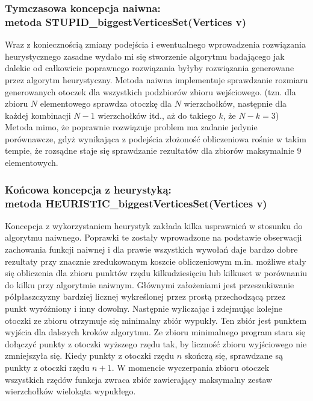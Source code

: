 \documentclass[11pt,a4paper]{article}
\begin{document}
\subsubsection{Tymczasowa koncepcja naiwna: \\ metoda STUPID\_biggestVerticesSet(Vertices v)}
Wraz z koniecznością zmiany podejścia i ewentualnego wprowadzenia rozwiązania heurystycznego zasadne wydało mi się stworzenie algorytmu badającego jak dalekie od całkowicie poprawnego rozwiązania byłyby rozwiązania generowane przez algorytm heurystyczny. Metoda naiwna implementuje sprawdzanie rozmiaru generowanych otoczek dla wszystkich podzbiorów zbioru wejściowego. (tzn. dla zbioru $N$ elementowego sprawdza otoczkę dla $N$ wierzchołków, następnie dla każdej kombinacji $N-1$ wierzchołków itd., aż do takiego $k$, że $N-k=3$) Metoda mimo, że poprawnie rozwiązuje problem ma zadanie jedynie porównawcze, gdyż wynikająca z podejścia złożoność obliczeniowa rośnie w takim tempie, że rozsądne staje się sprawdzanie rezultatów dla zbiorów maksymalnie 9 elementowych.

\subsubsection{Końcowa koncepcja z heurystyką: \\ metoda HEURISTIC\_biggestVerticesSet(Vertices v)}
Koncepcja z wykorzystaniem heurystyk zakłada kilka usprawnień w stosunku do algorytmu naiwnego. Poprawki te zostały wprowadzone na podstawie obserwacji zachowania funkcji naiwnej i dla prawie wszystkich wywołań daje bardzo dobre rezultaty przy znacznie zredukowanym koszcie obliczeniowym m.in. możliwe stały się obliczenia dla zbioru punktów rzędu kilkudziesięciu lub kilkuset w porównaniu do kilku przy algorytmie naiwnym. Głównymi założeniami jest przeszukiwanie półpłaszczyzny bardziej licznej wykreślonej przez prostą przechodzącą przez punkt wyróżniony i inny dowolny. Następnie wyliczając i zdejmując kolejne otoczki ze zbioru otrzymuje się minimalny zbiór wypukły. Ten zbiór jest punktem wyjścia dla dalszych kroków algorytmu. Ze zbioru minimalnego program stara się dołączyć punkty z otoczki wyższego rzędu tak, by liczność zbioru wyjściowego nie zmniejszyła się. Kiedy punkty z otoczki rzędu $n$ skończą się, sprawdzane są punkty z otoczki rzędu $n+1$. W momencie wyczerpania zbioru otoczek wszystkich rzędów funkcja zwraca zbiór zawierający maksymalny zestaw wierzchołków wielokąta wypukłego.
\end{document}
